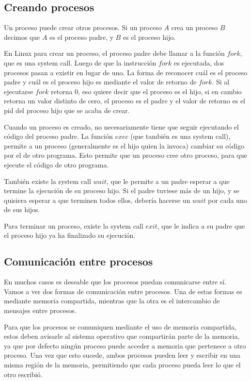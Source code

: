 \documentclass{article}
\begin{document}
\subsection{Creando procesos}

Un proceso puede crear otros procesos. Si un proceso $A$ crea un proceso $B$ decimos que $A$ es el proceso padre, y $B$ es el proceso hijo.

En Linux para crear un proceso, el proceso padre debe llamar a la funci\'on $fork$, que es una system call. Luego de que la instrucci\'on $fork$ es ejecutada, dos procesos pasan a existir en lugar de uno. La forma de reconocer cu\'al es el proceso padre y cu\'al es el proceso hijo es mediante el valor de retorno de $fork$. Si al ejecutarse $fork$ retorna 0, eso quiere decir que el proceso es el hijo, si en cambio retorna un valor distinto de cero, el proceso es el padre y el valor de retorno es el pid del proceso hijo que se acaba de crear.

Cuando un proceso es creado, no necesariamente tiene que seguir ejecutando el c\'odigo del proceso padre. La funci\'on $exec$ (que tambi\'en es una system call), permite a un proceso (generalmente es el hijo quien la invoca) cambiar su c\'odigo por el de otro programa. Esto permite que un proceso cree otro proceso, para que ejecute el c\'odigo de otro programa.

Tambi\'en existe la system call $wait$, que le permite a un padre esperar a que termine la ejecuci\'on de su proceso hijo. Si el padre tuviese m\'as de un hijo, y se quisiera esperar a que terminen todos ellos, deber\'ia hacerse un $wait$ por cada uno de sus hijos.

Para terminar un proceso, existe la system call $exit$, que le indica a su padre que el proceso hijo ya ha finalizado su ejecuci\'on.

\subsection{Comunicaci\'on entre procesos}

En muchos casos es deseable que los procesos puedan comunicarse entre s\'i. Vamos a ver dos formas de comunicaci\'on entre procesos. Una de estas formas es mediante memoria compartida, mientras que la otra es el intercambio de mensajes entre procesos.

Para que los procesos se comuniquen mediante el uso de memoria compartida, estos deben avisarle al sistema operativo que compartir\'an parte de la memoria, ya que por defecto ning\'un proceso puede acceder a memoria que pertenece a otro proceso. Una vez que esto sucede, ambos procesos pueden leer y escribir en una misma regi\'on de la memoria, permitiendo que cada proceso pueda leer lo que el otro escribi\'o.
\end{document}
